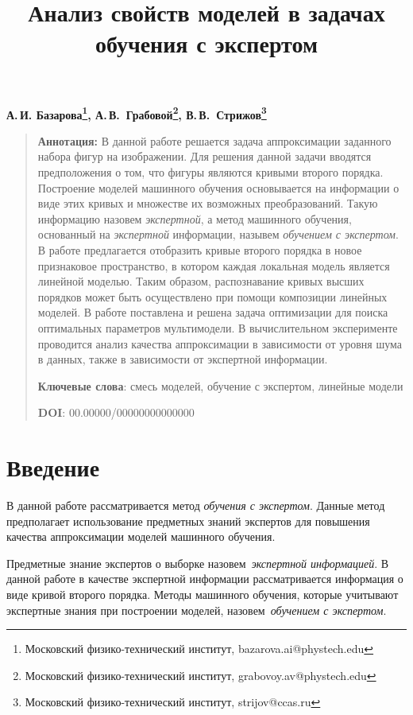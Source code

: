 \documentclass[12pt, twoside]{article}
\numberwithin{equation}{section}
\begin{document}
\title{\bf Анализ свойств моделей в задачах обучения с экспертом}
\date{}
\author{}
\maketitle

\begin{center}
\bf
А.\,И. Базарова\footnote{Московский физико-технический институт, bazarova.ai@phystech.edu}, А.\,В.~Грабовой\footnote{Московский физико-технический институт, grabovoy.av@phystech.edu}, В.\,В.~Стрижов\footnote{Московский физико-технический институт, strijov@ccas.ru}

\end{center}

{\centering\begin{quote}
\textbf{Аннотация:} В данной работе решается задача аппроксимации заданного набора фигур на изображении. Для решения данной задачи вводятся предположения о том, что фигуры являются кривыми второго порядка. Построение моделей машинного обучения основывается на информации о виде этих кривых и множестве их возможных преобразований. Такую информацию назовем \textit{экспертной}, а метод машинного обучения, основанный на \textit{экспертной} информации, назывем \textit{обучением с экспертом}.
В работе предлагается отобразить кривые второго порядка в новое признаковое пространство, в котором каждая локальная модель является линейной моделью. Таким образом, распознавание кривых высших порядков может быть осуществлено при помощи композиции линейных моделей. В работе поставлена и решена задача оптимизации для поиска оптимальных параметров мультимодели.
В вычислительном эксперименте проводится анализ качества аппроксимации в зависимости от уровня шума в данных, также в зависимости от экспертной информации.
    
\smallskip
\textbf{Ключевые слова}: смесь моделей, обучение с экспертом, линейные модели

\smallskip
\textbf{DOI}: 00.00000/00000000000000
\end{quote}
}

\section{Введение}
В данной работе рассматривается метод \textit{обучения с экспертом}. Данные метод предполагает использование предметных знаний экспертов для повышения качества аппроксимации моделей машинного обучения.

Предметные знание экспертов о выборке назовем~\textit{экспертной информацией}. В данной работе в качестве экспертной информации рассматривается информация о виде кривой второго порядка. Методы машинного обучения, которые учитывают экспертные знания при построении моделей, назовем~\textit{обучением с экспертом}.
\end{document}
